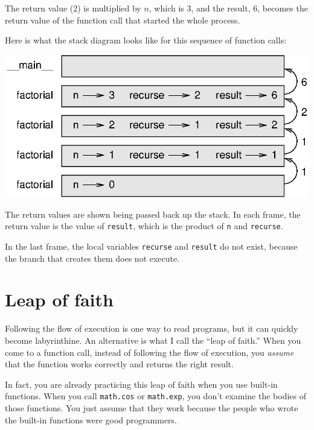 \documentclass[10pt]{book}
\begin{document}
The return value (2) is multiplied by $n$, which is 3, and the result, 6,
becomes the return value of the function call that started the whole
process.


Here is what the stack diagram looks like for this sequence of function
calls:

\vspace{0.1in}
\beforefig
\centerline{\includegraphics{figs/stack3.eps}}
\afterfig
\vspace{0.1in}

The return values are shown being passed back up the stack.  In each
frame, the return value is the value of {\tt result}, which is the
product of {\tt n} and {\tt recurse}.


In the last frame, the local
variables {\tt recurse} and {\tt result} do not exist, because
the branch that creates them does not execute.



\section{Leap of faith}

Following the flow of execution is one way to read programs, but
it can quickly become labyrinthine.  An
alternative is what I call the ``leap of faith.''  When you come to a
function call, instead of following the flow of execution, you {\em
assume} that the function works correctly and returns the right
result.

In fact, you are already practicing this leap of faith when you use
built-in functions.  When you call {\tt math.cos} or {\tt math.exp},
you don't examine the bodies of those functions.  You just
assume that they work because the people who wrote the built-in
functions were good programmers.
\end{document}
